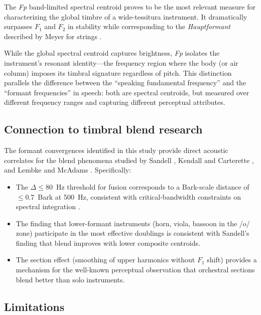 \documentclass[12pt,a4paper]{article}
\begin{document}
The \textit{Fp} band-limited spectral centroid proves to be the most relevant
measure for characterizing the global timbre of a wide-tessitura instrument. It
dramatically surpasses $F_1$ and $F_2$ in stability while corresponding to the
\emph{Hauptformant} described by Meyer for strings \citep{Meyer2009}.

While the global spectral centroid \citep{Peeters2011} captures brightness,
\textit{Fp} isolates the instrument's resonant identity---the frequency region
where the body (or air column) imposes its timbral signature regardless of pitch.
This distinction parallels the difference between the ``speaking fundamental
frequency'' and the ``formant frequencies'' in speech: both are spectral centroids,
but measured over different frequency ranges and capturing different perceptual
attributes.

\subsection{Connection to timbral blend research}

The formant convergences identified in this study provide direct acoustic
correlates for the blend phenomena studied by Sandell \citep{Sandell1995},
Kendall and Carterette \citep{Kendall1993}, and Lembke and McAdams
\citep{Lembke2017}. Specifically:

\begin{itemize}
\item The $\Delta \leq 80$~Hz threshold for fusion corresponds to a Bark-scale
distance of $\leq 0.7$~Bark at 500~Hz, consistent with critical-bandwidth
constraints on spectral integration \citep{Zwicker1961}.

\item The finding that lower-formant instruments (horn, viola, bassoon in the
/o/ zone) participate in the most effective doublings is consistent with
Sandell's finding that blend improves with lower composite centroids.

\item The section effect (smoothing of upper harmonics without $F_1$ shift)
provides a mechanism for the well-known perceptual observation that
orchestral sections blend better than solo instruments.
\end{itemize}

\subsection{Limitations}
\end{document}
